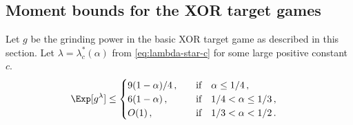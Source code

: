 
\subsection{Moment bounds for the XOR target games}

\begin{lemma}\label{lemma:xor-game-basic-moment}
Let $g$ be the grinding power in the basic XOR target game as described in this section.
Let $\lambda = \lambda_c^*(\alpha)$ from \eqref{eq:lambda-star-c} for some large positive constant $c$. 
\begin{align}
    \Exp[g^\lambda]
    &\leq \begin{cases}
        9(1-\alpha)/4\,, & \quad\text{if}\quad \alpha \leq 1/4\,, \\
        6(1-\alpha)\,, & \quad\text{if}\quad 1/4 < \alpha \leq 1/3\,, \\
        O(1)\,, & \quad\text{if}\quad 1/3 < \alpha < 1/2\,.
    \end{cases}
\end{align}
\end{lemma}


